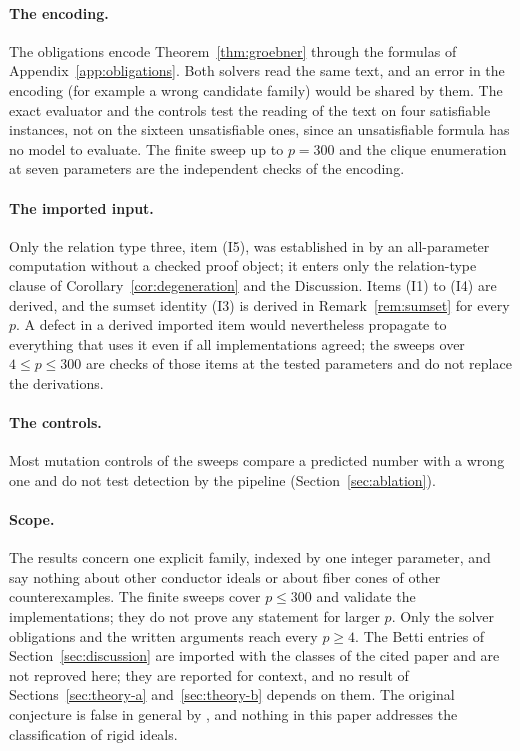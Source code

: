 \documentclass[11pt]{article}
\theoremstyle{definition}
\theoremstyle{remark}
\begin{document}
\paragraph{The encoding.} The obligations encode Theorem~\ref{thm:groebner} through the formulas of
Appendix~\ref{app:obligations}. Both solvers read the same text, and an error in the encoding
(for example a wrong candidate family) would be shared by them. The exact evaluator and the controls test the
reading of the text on four satisfiable instances, not on the sixteen unsatisfiable ones, since an
unsatisfiable formula has no model to evaluate. The finite sweep up to $p=300$ and the clique
enumeration at seven parameters are the independent checks of the encoding.

\paragraph{The imported input.} Only the relation type three, item (I5), was established in
\cite{SantibanezLeal2026} by an all-parameter computation without a checked proof object; it enters
only the relation-type clause of Corollary~\ref{cor:degeneration} and the Discussion. Items (I1) to (I4)
are derived, and the sumset identity (I3) is derived in Remark~\ref{rem:sumset} for every $p$. A defect
in a derived imported item would nevertheless propagate to everything that uses it even if all
implementations agreed; the sweeps over $4\leq p\leq300$ are checks of those items at the tested parameters
and do not replace the derivations.

\paragraph{The controls.} Most mutation controls of the sweeps compare a predicted number with a wrong
one and do not test detection by the pipeline (Section~\ref{sec:ablation}).

\paragraph{Scope.} The results concern one explicit family, indexed by one integer parameter, and say
nothing about other conductor ideals or about fiber cones of other counterexamples. The finite sweeps cover $p\leq300$ and
validate the implementations; they do not prove any statement for larger $p$. Only
the solver obligations and the written arguments reach every $p\geq4$. The Betti entries of
Section~\ref{sec:discussion} are imported with the classes of the cited paper and are not reproved here; they are reported for
context, and no result of Sections~\ref{sec:theory-a} and~\ref{sec:theory-b} depends on them. The
original conjecture is false in general by \cite{Pham2026,PhamArxiv2026,CGI2026}, and nothing in this
paper addresses the classification of rigid ideals.
\end{document}
